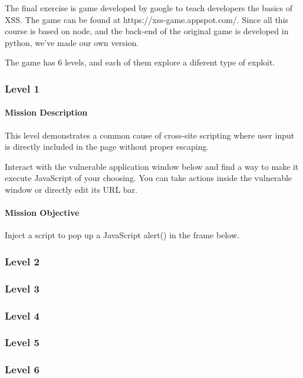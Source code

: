 
\begin{Exercise}[label={websec-xss-game}]
	The final exercise is game developed by google to teach developers the basics of XSS. The game can be found at https://xss-game.appspot.com/. Since all this course is based on node, and the back-end of the original game is developed in python, we've made our own version. 
	
	The game has 6 levels, and each of them explore a diferent type of exploit.
	
	\subsubsection{Level 1}
	\paragraph{Mission Description}
	This level demonstrates a common cause of cross-site scripting where user input is directly included in the page without proper escaping. 
	
	Interact with the vulnerable application window below and find a way to make it execute JavaScript of your choosing. You can take actions inside the vulnerable window or directly edit its URL bar.
	\paragraph{Mission Objective}
	Inject a script to pop up a JavaScript alert() in the frame below. 

	\subsubsection{Level 2}
	\subsubsection{Level 3}
	\subsubsection{Level 4}
	\subsubsection{Level 5}
	\subsubsection{Level 6}
	
\end{Exercise}
